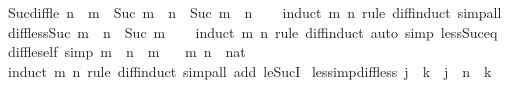 \begin{isabellebody}
%
\endisadelimdocument
{}\isamarkupfalse%
\ Suc{\isacharunderscore}{\kern0pt}diff{\isacharunderscore}{\kern0pt}le{\isacharcolon}{\kern0pt}\ {\isachardoublequoteopen}n\ {\isasymle}\ m\ {\isasymLongrightarrow}\ Suc\ m\ {\isacharminus}{\kern0pt}\ n\ {\isacharequal}{\kern0pt}\ Suc\ {\isacharparenleft}{\kern0pt}m\ {\isacharminus}{\kern0pt}\ n{\isacharparenright}{\kern0pt}{\isachardoublequoteclose}\isanewline
%
\isadelimproof
\ \ %
\endisadelimproof
%
\isatagproof
{}\isamarkupfalse%
\ {\isacharparenleft}{\kern0pt}induct\ m\ n\ rule{\isacharcolon}{\kern0pt}\ diff{\isacharunderscore}{\kern0pt}induct{\isacharparenright}{\kern0pt}\ simp{\isacharunderscore}{\kern0pt}all%
\endisatagproof
{\isafoldproof}%
%
\isadelimproof
\isanewline
%
\endisadelimproof
\isanewline
{}\isamarkupfalse%
\ diff{\isacharunderscore}{\kern0pt}less{\isacharunderscore}{\kern0pt}Suc{\isacharcolon}{\kern0pt}\ {\isachardoublequoteopen}m\ {\isacharminus}{\kern0pt}\ n\ {\isacharless}{\kern0pt}\ Suc\ m{\isachardoublequoteclose}\isanewline
%
\isadelimproof
\ \ %
\endisadelimproof
%
\isatagproof
{}\isamarkupfalse%
\ {\isacharparenleft}{\kern0pt}induct\ m\ n\ rule{\isacharcolon}{\kern0pt}\ diff{\isacharunderscore}{\kern0pt}induct{\isacharparenright}{\kern0pt}\ {\isacharparenleft}{\kern0pt}auto\ simp{\isacharcolon}{\kern0pt}\ less{\isacharunderscore}{\kern0pt}Suc{\isacharunderscore}{\kern0pt}eq{\isacharparenright}{\kern0pt}%
\endisatagproof
{\isafoldproof}%
%
\isadelimproof
\isanewline
%
\endisadelimproof
\isanewline
{}\isamarkupfalse%
\ diff{\isacharunderscore}{\kern0pt}le{\isacharunderscore}{\kern0pt}self\ {\isacharbrackleft}{\kern0pt}simp{\isacharbrackright}{\kern0pt}{\isacharcolon}{\kern0pt}\ {\isachardoublequoteopen}m\ {\isacharminus}{\kern0pt}\ n\ {\isasymle}\ m{\isachardoublequoteclose}\isanewline
\ \ \ m\ n\ {\isacharcolon}{\kern0pt}{\isacharcolon}{\kern0pt}\ nat\isanewline
%
\isadelimproof
\ \ %
\endisadelimproof
%
\isatagproof
{}\isamarkupfalse%
\ {\isacharparenleft}{\kern0pt}induct\ m\ n\ rule{\isacharcolon}{\kern0pt}\ diff{\isacharunderscore}{\kern0pt}induct{\isacharparenright}{\kern0pt}\ {\isacharparenleft}{\kern0pt}simp{\isacharunderscore}{\kern0pt}all\ add{\isacharcolon}{\kern0pt}\ le{\isacharunderscore}{\kern0pt}SucI{\isacharparenright}{\kern0pt}%
\endisatagproof
{\isafoldproof}%
%
\isadelimproof
\isanewline
%
\endisadelimproof
\isanewline
{}\isamarkupfalse%
\ less{\isacharunderscore}{\kern0pt}imp{\isacharunderscore}{\kern0pt}diff{\isacharunderscore}{\kern0pt}less{\isacharcolon}{\kern0pt}\ {\isachardoublequoteopen}j\ {\isacharless}{\kern0pt}\ k\ {\isasymLongrightarrow}\ j\ {\isacharminus}{\kern0pt}\ n\ {\isacharless}{\kern0pt}\ k{\isachardoublequoteclose}\isanewline

\end{isabellebody}
